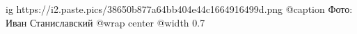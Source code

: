  
 
 
 
 

\ifcmt
  ig https://i2.paste.pics/38650b877a64bb404e44c1664916499d.png
	@caption Фото: Иван Станиславский
  @wrap center
  @width 0.7
\fi
